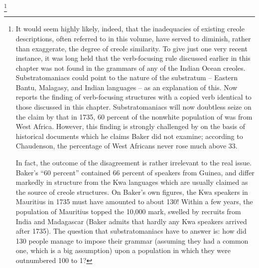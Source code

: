 \footnote{It would seem highly likely, indeed, that the inadequacies of existing creole descriptions, often referred to in this volume, have served to diminish, rather than exaggerate, the degree of creole similarity. To give just one very recent instance, it was long held that the verb-focusing rule discussed earlier in this chapter was not found in the grammars of any of the Indian Ocean creoles. Substratomaniacs could point to the nature of the substratum -- Eastern Bantu, Malagasy, and Indian languages -- as an explanation of this. Now \citet{Corne1977} reports the finding of verb-focusing structures with a copied verb identical to those discussed in this chapter. Substratomaniacs will now doubtless seize on the claim by \citet{Baker1976} that in 1735, 60 percent of the nonwhite population of  was from West Africa. However, this finding is strongly challenged by \citet{Chaudenson1979} on the basis of historical documents which he claims Baker did not examine; according to Chaudenson, the percentage of West Africans never rose much above 33.
	
In fact, the outcome of the disagreement is rather irrelevant to the real issue. Baker's ``60 percent'' contained 66 percent of speakers from Guinea, and  differ markedly in structure from the Kwa languages which are usually claimed as the source of creole structures. On Baker's own figures, the Kwa speakers in Mauritius in 1735 must have amounted to about 130! Within a few years, the population of Mauritius topped the 10,000 mark, swelled by recruits from India and Madagascar (Baker admits that hardly any Kwa speakers arrived after 1735). The question that substratomaniacs have to answer is: how did 130 people manage to impose their grammar (assuming they had a common one, which is a big assumption) upon a population in which they were outnumbered 100 to 1?}

